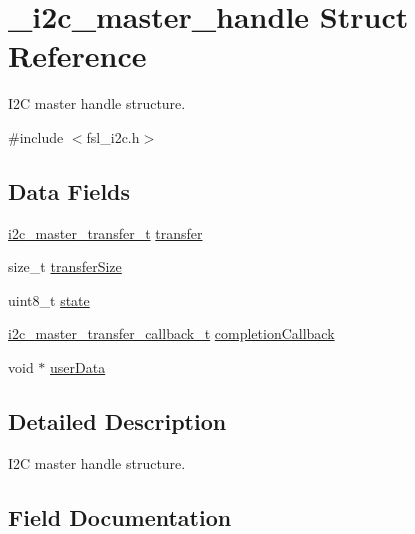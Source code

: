 \hypertarget{struct__i2c__master__handle}{}\section{\+\_\+i2c\+\_\+master\+\_\+handle Struct Reference}
\label{struct__i2c__master__handle}


I2C master handle structure.  




{\ttfamily \#include $<$fsl\+\_\+i2c.\+h$>$}

\subsection*{Data Fields}
\begin{DoxyCompactItemize}
\item 
\mbox{\hyperlink{group__i2c__driver_ga0e25c3c153992361c8d359a86b70d3c6}{i2c\+\_\+master\+\_\+transfer\+\_\+t}} \mbox{\hyperlink{struct__i2c__master__handle_a9f792796934731101c55954d82000811}{transfer}}
\item 
size\+\_\+t \mbox{\hyperlink{struct__i2c__master__handle_a10e6d1f095e525fa85ffe957081ed7a7}{transfer\+Size}}
\item 
uint8\+\_\+t \mbox{\hyperlink{struct__i2c__master__handle_a0b57aa10271a66f3dc936bba1d2f3830}{state}}
\item 
\mbox{\hyperlink{group__i2c__driver_gafa39d30cd808d79b774361874f227204}{i2c\+\_\+master\+\_\+transfer\+\_\+callback\+\_\+t}} \mbox{\hyperlink{struct__i2c__master__handle_ab886e4f1a8a9cd0953a6dc2b0f33e87c}{completion\+Callback}}
\item 
void $\ast$ \mbox{\hyperlink{struct__i2c__master__handle_a2e294dd14122c554baa0665072b4ca7a}{user\+Data}}
\end{DoxyCompactItemize}


\subsection{Detailed Description}
I2C master handle structure. 

\subsection{Field Documentation}
\mbox{\label{struct__i2c__master__handle_ab886e4f1a8a9cd0953a6dc2b0f33e87c}} 
